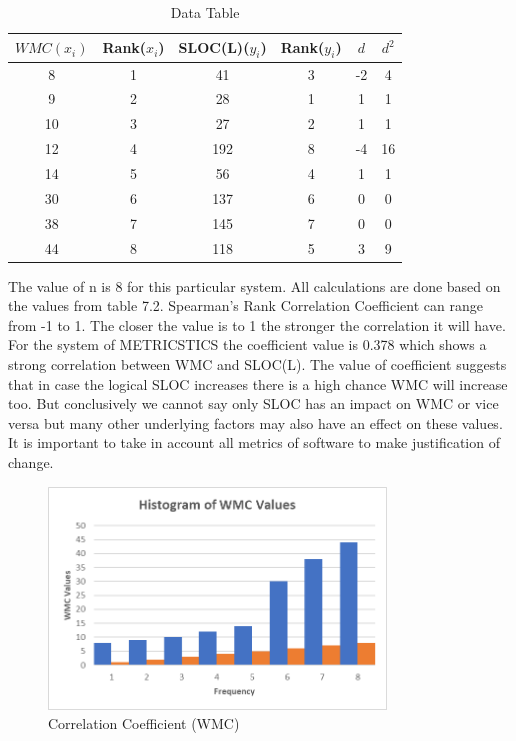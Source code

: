 \documentclass[english,12pt,a4paper]{report}
\begin{document}
	\begin{table}[htbp]
		\centering
		
		\begin{tabular}{|c|c|c|c|c|c|}
			\hline
			$WMC(x_i)$ & Rank($x_i$) & SLOC(L)($y_i$) & Rank($y_i$) & $d$ & $d^2$ \\
			\hline
			8 &	1	&41 &	3 &	-2	&4 \\
			9	&2	&28 &	1 &	1 &	1 \\
			10 & 3 & 27 &	2 &	1 &	1 \\
			12 & 4 &	192 &	8 &	-4 &	16 \\
			14 &	5	& 56	& 4 &	1 &	1\\
			30 &	6 &	137 &	6 &	0 &	0\\
			38 &	7 &	145 &	7	& 0 &	0 \\
			44 &	8	& 118 &	5 &	3 &	9\\
			
			
			
			\hline
		\end{tabular}
		\caption{Data Table}
	\end{table}
	The value of n is 8 for this particular system. All calculations are done based on the values from table 7.2. Spearman’s Rank Correlation Coefficient can range from -1 to 1. The closer the value is to 1 the stronger the correlation it will have. For the system of METRICSTICS the coefficient value is 0.378 which shows a strong correlation between WMC and SLOC(L). The value of coefficient suggests that in case the logical SLOC increases there is a high chance WMC will increase too. But conclusively we cannot say only SLOC has an impact on WMC or vice versa but many other underlying factors may also have an effect on these values. It is important to take in account all metrics of software to make justification of change.
	
	
	\begin{figure}[h]
		\centering
		\includegraphics[width=0.8\textwidth]{images/HistoWMC.png}
		\caption{Correlation Coefficient (WMC)}
		\label{fig:Correlation Coefficient (WMC)}
	\end{figure}
	
\end{document}
